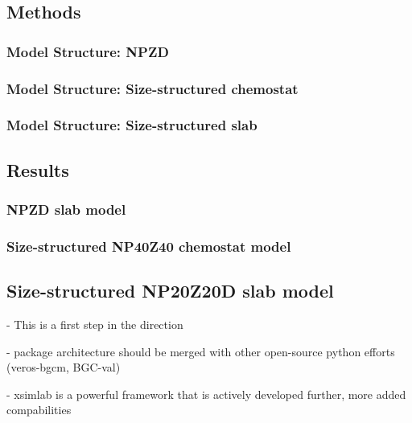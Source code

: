 \documentclass[journal abbreviations, manuscript]{copernicus}
\begin{document}
\subsection{Methods}

\subsubsection{Model Structure: NPZD}

\subsubsection{Model Structure: Size-structured chemostat}

\subsubsection{Model Structure: Size-structured slab}

\subsection{Results}

\subsubsection{NPZD slab model}

\subsubsection{Size-structured NP40Z40 chemostat model}

\subsection{Size-structured NP20Z20D slab model}







\conclusions  %

- This is a first step in the direction

- package architecture should be merged with other open-source python efforts (veros-bgcm, BGC-val)

- xsimlab is a powerful framework that is actively developed further, more added compabilities
\end{document}
